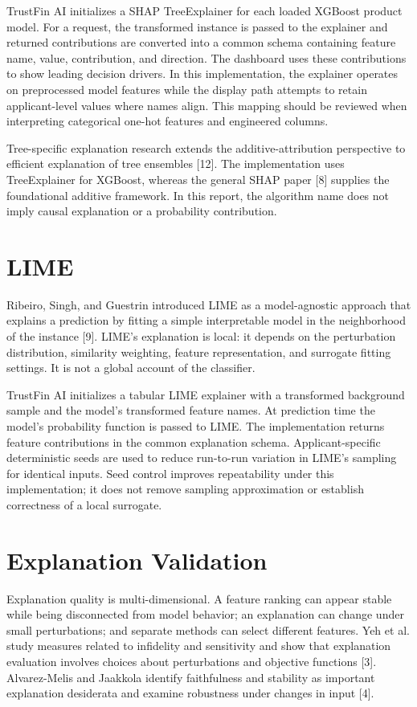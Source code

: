 \documentclass[12pt,a4paper]{report}
\begin{document}
TrustFin AI initializes a SHAP TreeExplainer for each loaded XGBoost product model. For a request, the transformed instance is passed to the explainer and returned contributions are converted into a common schema containing feature name, value, contribution, and direction. The dashboard uses these contributions to show leading decision drivers. In this implementation, the explainer operates on preprocessed model features while the display path attempts to retain applicant-level values where names align. This mapping should be reviewed when interpreting categorical one-hot features and engineered columns.

Tree-specific explanation research extends the additive-attribution perspective to efficient explanation of tree ensembles [12]. The implementation uses TreeExplainer for XGBoost, whereas the general SHAP paper [8] supplies the foundational additive framework. In this report, the algorithm name does not imply causal explanation or a probability contribution.

\section{LIME}
Ribeiro, Singh, and Guestrin introduced LIME as a model-agnostic approach that explains a prediction by fitting a simple interpretable model in the neighborhood of the instance [9]. LIME’s explanation is local: it depends on the perturbation distribution, similarity weighting, feature representation, and surrogate fitting settings. It is not a global account of the classifier.

TrustFin AI initializes a tabular LIME explainer with a transformed background sample and the model’s transformed feature names. At prediction time the model’s probability function is passed to LIME. The implementation returns feature contributions in the common explanation schema. Applicant-specific deterministic seeds are used to reduce run-to-run variation in LIME’s sampling for identical inputs. Seed control improves repeatability under this implementation; it does not remove sampling approximation or establish correctness of a local surrogate.

\section{Explanation Validation}
Explanation quality is multi-dimensional. A feature ranking can appear stable while being disconnected from model behavior; an explanation can change under small perturbations; and separate methods can select different features. Yeh et al. study measures related to infidelity and sensitivity and show that explanation evaluation involves choices about perturbations and objective functions [3]. Alvarez-Melis and Jaakkola identify faithfulness and stability as important explanation desiderata and examine robustness under changes in input [4].
\end{document}
